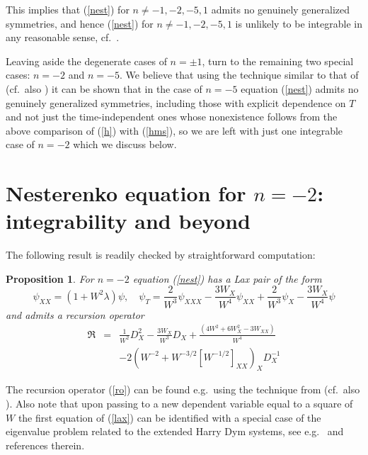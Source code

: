 \documentclass[12pt]{article}
\newtheorem{pro}{Proposition}
\begin{document}

This implies that (\ref{nest}) for $n\neq -1,-2,-5,1$  admits no genuinely generalized symmetries,
and hence (\ref{nest}) for $n\neq -1,-2,-5,1$ is unlikely to be integrable in any reasonable sense, cf.\  \cite{mikshab}.

Leaving aside the degenerate cases of $n=\pm 1$, turn to the remaining two special cases: $n=-2$ and $n=-5$. We believe that using the technique similar to that of \cite{sv} (cf.\ also \cite{Vodova, v}) it can be shown that in the case of $n=-5$ equation (\ref{nest}) admits no genuinely generalized symmetries, including those with explicit dependence on $T$ and not just the time-independent ones whose nonexistence follows from the above comparison of (\ref{h}) with (\ref{hms}), so we are left with just one integrable case of $n=-2$ which we discuss below.

\section{Nesterenko equation for $n=-2$: integrability and beyond}\label{sec:intcase}
The following result is readily checked by straightforward computation:
\begin{pro}\label{intcase}
For $n=-2$ equation (\ref{nest})
has a Lax pair of the form
\begin{equation}\label{lax}
\psi_{XX}=(1+W^2\lambda)\psi,\quad
\psi_T=\frac{2}{W^3}\psi_{XXX}-\frac{3W_X}{W^4}\psi_{XX}+\frac{2}{W^3}\psi_X-\frac{3W_X}{W^4}\psi
\end{equation}
and %
admits a recursion operator %
\begin{equation}\label{ro}
\begin{array}{rcl}
\mathfrak{R}&=&\displaystyle\frac{1}{W^2} D_X^2-\frac{3 W_X}{W^3}D_X+\frac{(4 W^2+6 W_X^2-3 W_{XX})}{W^4}\\[5mm]
&&-2\left(W^{-2}+W^{-3/2} \left[W^{-1/2}  \right ]_{XX}  \right)_X D_X^{-1}
\end{array}
\end{equation}
\end{pro}
The recursion operator (\ref{ro}) can be found e.g.\ using the technique from \cite{mas} (cf.\ also \cite{sc}).
%
Also note that upon passing to a new dependent variable equal to a square of $W$ the first equation of (\ref{lax}) can be identified with a special case of the eigenvalue problem related to the extended Harry Dym systems, see e.g.\ \cite{MP} and references therein.
\end{document}
